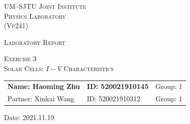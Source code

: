\documentclass{article}
\begin{document}
\vspace*{0.4cm}

\hrulefill %

\thispagestyle{empty} %

\begin{center}
\begin{large}
\scshape{UM--SJTU Joint Institute \vspace{0.3em} \\ Physics Laboratory \\(Vp241)}
\end{large}

\hrulefill %

\vspace*{7.5cm}
\begin{Large}
\scshape{{Laboratory Report}}
\end{Large}

\vspace{2.5em}

\begin{large}
\scshape{Exercise 3}\\
\vspace{0.5em}
\scshape{Solar Cells: $I-V$ Characteristics}
\end{large}
\end{center}

\vspace{13em}

\begin{table}[h!]
\center
\begin{tabular}{lll}
\textbf{Name: Haoming  Zhu} \hspace*{2em}&
\textbf{ID: 520021910145}\hspace*{2em}
& Group: 1 \\
Partner: Xinkai Wang \hspace*{2em}&
ID: 520021910312\hspace*{2em}
& Group: 1 \\
\end{tabular}
\end{table}

\vspace{-0.4cm}

\begin{center}
\hspace{0.3em} Date: 2021.11.19
\end{center}

\newpage
\tableofcontents
\setcounter{page}{0}
\thispagestyle{empty}
\newpage
\end{document}
